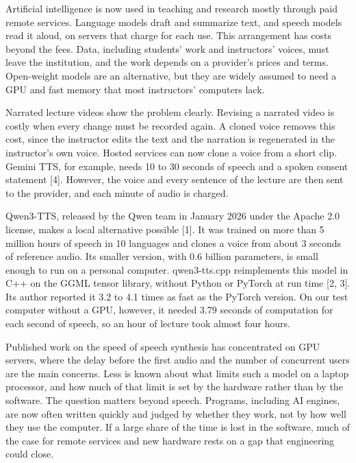 \documentclass[11pt]{article}
\begin{document}
Artificial intelligence is now used in teaching and research mostly
through paid remote services. Language models draft and summarize text,
and speech models read it aloud, on servers that charge for each use.
This arrangement has costs beyond the fees. Data, including students'
work and instructors' voices, must leave the institution, and the work
depends on a provider's prices and terms. Open-weight models are an
alternative, but they are widely assumed to need a GPU and fast memory
that most instructors' computers lack.

Narrated lecture videos show the problem clearly. Revising a narrated
video is costly when every change must be recorded again. A cloned voice
removes this cost, since the instructor edits the text and the narration
is regenerated in the instructor's own voice. Hosted services can now
clone a voice from a short clip. Gemini TTS, for example, needs 10 to 30
seconds of speech and a spoken consent statement {[}4{]}. However, the
voice and every sentence of the lecture are then sent to the provider,
and each minute of audio is charged.

Qwen3-TTS, released by the Qwen team in January 2026 under the Apache
2.0 license, makes a local alternative possible {[}1{]}. It was trained
on more than 5 million hours of speech in 10 languages and clones a
voice from about 3 seconds of reference audio. Its smaller version, with
0.6 billion parameters, is small enough to run on a personal computer.
qwen3-tts.cpp reimplements this model in C++ on the GGML tensor library,
without Python or PyTorch at run time {[}2, 3{]}. Its author reported it
3.2 to 4.1 times as fast as the PyTorch version. On our test computer
without a GPU, however, it needed 3.79 seconds of computation for each
second of speech, so an hour of lecture took almost four hours.

Published work on the speed of speech synthesis has concentrated on GPU
servers, where the delay before the first audio and the number of
concurrent users are the main concerns. Less is known about what limits
such a model on a laptop processor, and how much of that limit is set by
the hardware rather than by the software. The question matters beyond
speech. Programs, including AI engines, are now often written quickly
and judged by whether they work, not by how well they use the computer.
If a large share of the time is lost in the software, much of the case
for remote services and new hardware rests on a gap that engineering
could close.
\end{document}
